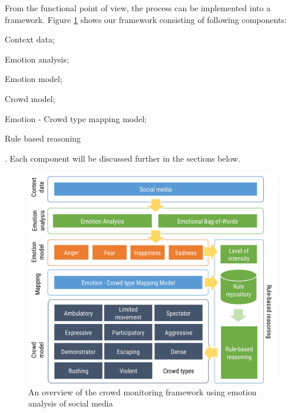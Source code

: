 From the functional point of view, the process can be implemented into a framework. Figure \ref{fig:frameworkOverview} shows our framework consisting of following components:
\begin{inparaenum}[i)]
\item Context data;
\item Emotion analysis;
\item Emotion model;
\item Crowd model;
\item Emotion - Crowd type mapping model;
\item Rule based reasoning
\end{inparaenum}. Each component will be discussed further in the sections below.

\begin{figure}[htb!] 
\centering    
\includegraphics[width=1.0\textwidth]{FrameworkOverview}
\caption{An overview of the crowd monitoring framework using emotion analysis of social media}
\label{fig:frameworkOverview}
\end{figure}

